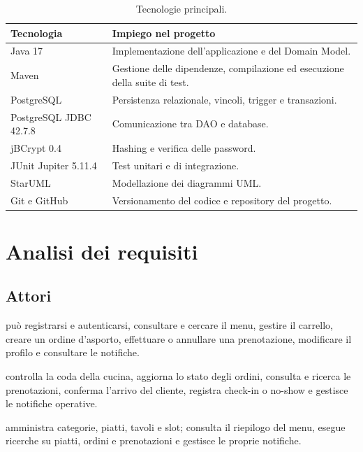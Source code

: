 \documentclass[12pt,a4paper]{article}
\begin{document}
\begin{table}[H]
\centering
{}
\begin{tabular}{p{4.1cm}p{10cm}}
\toprule
\textbf{Tecnologia} & \textbf{Impiego nel progetto} \\
\midrule
Java 17 & Implementazione dell'applicazione e del Domain Model. \\
Maven & Gestione delle dipendenze, compilazione ed esecuzione della suite di test. \\
PostgreSQL & Persistenza relazionale, vincoli, trigger e transazioni. \\
PostgreSQL JDBC 42.7.8 & Comunicazione tra DAO e database. \\
jBCrypt 0.4 & Hashing e verifica delle password. \\
JUnit Jupiter 5.11.4 & Test unitari e di integrazione. \\
StarUML & Modellazione dei diagrammi UML. \\
Git e GitHub & Versionamento del codice e repository del progetto. \\
\bottomrule
\end{tabular}
\caption{Tecnologie principali.}
\end{table}

\section{Analisi dei requisiti}

\subsection{Attori}

\begin{description}[leftmargin=3.2cm,style=nextline]
  \item[Customer] può registrarsi e autenticarsi, consultare e cercare il menu,
  gestire il carrello, creare un ordine d'asporto, effettuare o annullare una
  prenotazione, modificare il profilo e consultare le notifiche.

  \item[Staff] controlla la coda della cucina, aggiorna lo stato degli ordini,
  consulta e ricerca le prenotazioni, conferma l'arrivo del cliente, registra
  check-in o no-show e gestisce le notifiche operative.

  \item[Owner] amministra categorie, piatti, tavoli e slot; consulta il riepilogo
  del menu, esegue ricerche su piatti, ordini e prenotazioni e gestisce le proprie
  notifiche.
\end{description}
\end{document}

